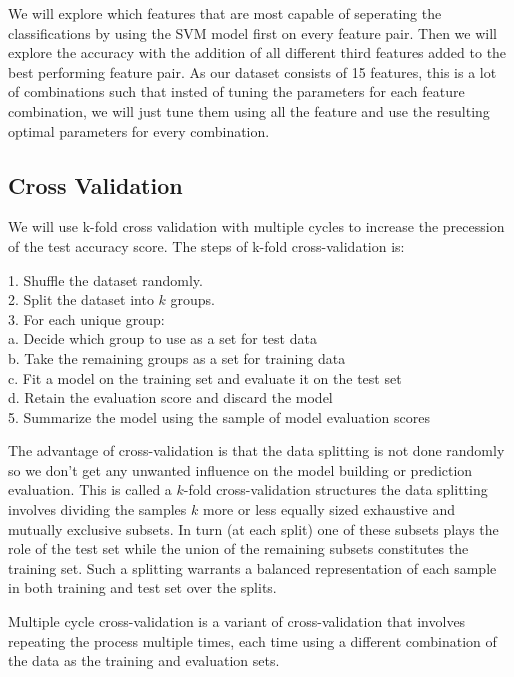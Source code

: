 We will explore which features that are most capable of seperating the classifications by 
using the SVM model first on every feature pair. Then we will explore the accuracy with the addition 
of all different third features added to the best performing feature pair. As our dataset consists of 15 
features, this is a lot of combinations such that insted of tuning the parameters for each feature
combination, we will just tune them using all the feature and use the resulting optimal parameters 
for every combination. 

\subsection{Cross Validation}
We will use k-fold cross validation with multiple cycles to increase the
precession of the test accuracy score. 
The steps of k-fold cross-validation is:
\begin{mdframed}[backgroundcolor=black!10]
\raggedright

1. Shuffle the dataset randomly.\\

2. Split the dataset into $k$ groups.\\

3. For each unique group:\\

\hspace{1cm}a. Decide which group to use as a set for test data\\

\hspace{1cm}b. Take the remaining groups as a set for training data\\

\hspace{1cm}c. Fit a model on the training set and evaluate it on the test set\\

\hspace{1cm}d. Retain the evaluation score and discard the model\\

5. Summarize the model using the sample of model evaluation scores\\

\end{mdframed}

The advantage of cross-validation is that the data splitting is not done
randomly so we don't get any unwanted influence on the model building or
prediction evaluation. This is called a  $k$-fold cross-validation structures
the data splitting involves dividing the samples $k$ more or less equally sized
exhaustive and mutually exclusive subsets. In turn (at each split) one of these
subsets plays the role of the test set while the union of the remaining subsets
constitutes the training set. Such a splitting warrants a balanced
representation of each sample in both training and test set over the splits. 

Multiple cycle cross-validation is a variant of cross-validation that involves
repeating the process multiple times, each time using a different combination
of the data as the training and evaluation sets. 

